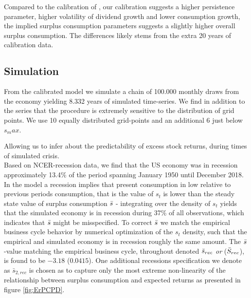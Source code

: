 Compared to the calibration of \citet{Campbell1999}, our calibration suggests a higher persistence parameter, higher volatility of dividend growth and lower consumption growth, the implied surplus consumption parameters suggests a slightly higher overall surplus consumption. The differences likely stems from the extra 20 years of calibration data. \\
\subsection{Simulation}
From the calibrated model we simulate a chain of 100.000 monthly draws from the economy yielding 8.332 years of simulated time-series. We find in addition to the series that the procedure is extremely sensitive to the distribution of grid points. We use 10 equally distributed grid-points and an additional 6 just below $s_max$.




Allowing us to infer about the predictability of excess stock returns, during times of simulated crisis. 
\newline
\\
Based on NCER-recession data, we find that the US economy was in recession approximately 13.4\% of the period spanning January 1950 until December 2018.  In the model a recession implies that present consumption in low relative to previous periods consumption, that is the value of $s_t$ is lower than the steady state value of surplus consumption $\Bar{s}$ - integrating over the density of $s_t$ yields that the simulated economy is in recession during 37\% of all observations, which indicates that $\Bar{s}$ might be misspecified. To correct $\Bar{s}$ we match the empirical business cycle behavior by numerical optimization of the $s_t$ density, such that the empirical and simulated economy is in recession roughly the same amount. The $\Bar{s}$-value matching the empirical business cycle, throughout denoted $\Bar{s}_{rec}$ \textit{or} ($\Bar{S}_{rec}$), is found to be $-3.18$ ($0.0415$). One additional recessions specification we denote as $\bar{s}_{2,rec}$ is chosen as to capture only the most extreme non-linearity of the relationship between surplus consumption and expected returns as presented in figure \ref{fig:ErPCPD}.





